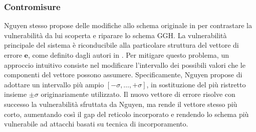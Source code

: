 \subsubsection{Contromisure}
Nguyen stesso propose delle modifiche allo schema originale in \cite[sezione 7]{Nguyen99} 
per contrastare la vulnerabilità da lui scoperta e riparare lo schema GGH.
La vulnerabilità principale del sistema è riconducibile alla particolare struttura del
vettore di errore $\mathbf{e}$, come definito dagli autori in \cite{GGH97}. Per mitigare 
questo problema, un approccio intuitivo consiste nel modificare l'intervallo dei possibili 
valori che le componenti del vettore possono assumere. Specificamente, Nguyen propose di 
adottare un intervallo più ampio $[-\sigma, \dots, +\sigma]$, in sostituzione del più 
ristretto insieme ${\pm\sigma}$ originariamente utilizzato. Il nuovo vettore di errore risolve
con successo la vulnerabilità sfruttata da Nguyen, ma rende il vettore stesso più corto, 
aumentando così il gap del reticolo incorporato e rendendo lo schema più vulnerabile ad 
attacchi basati su tecnica di incorporamento. 

